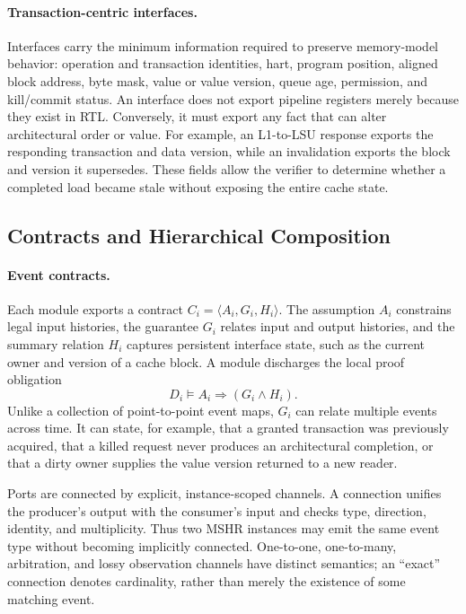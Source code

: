 \paragraph{Transaction-centric interfaces.}
Interfaces carry the minimum information required to preserve memory-model
behavior: operation and transaction identities, hart, program position,
aligned block address, byte mask, value or value version, queue age,
permission, and kill/commit status.  An interface does not export pipeline
registers merely because they exist in RTL.  Conversely, it must export any
fact that can alter architectural order or value.  For example, an L1-to-LSU
response exports the responding transaction and data version, while an
invalidation exports the block and version it supersedes.  These fields allow
the verifier to determine whether a completed load became stale without
exposing the entire cache state.

\subsection{Contracts and Hierarchical Composition}
\label{sec:contracts}

\paragraph{Event contracts.}
Each module exports a contract $C_i=\langle A_i,G_i,H_i\rangle$.  The
assumption $A_i$ constrains legal input histories, the guarantee $G_i$ relates
input and output histories, and the summary relation $H_i$ captures persistent
interface state, such as the current owner and version of a cache block.  A
module discharges the local proof obligation
\begin{equation}
  D_i \models A_i \Rightarrow (G_i \land H_i).
  \label{eq:local-contract}
\end{equation}
Unlike a collection of point-to-point event maps, $G_i$ can relate multiple
events across time.  It can state, for example, that a granted transaction was
previously acquired, that a killed request never produces an architectural
completion, or that a dirty owner supplies the value version returned to a
new reader.

Ports are connected by explicit, instance-scoped channels.  A connection
unifies the producer's output with the consumer's input and checks type,
direction, identity, and multiplicity.  Thus two MSHR instances may emit the
same event type without becoming implicitly connected.  One-to-one,
one-to-many, arbitration, and lossy observation channels have distinct
semantics; an ``exact'' connection denotes cardinality, rather than merely the
existence of some matching event.

